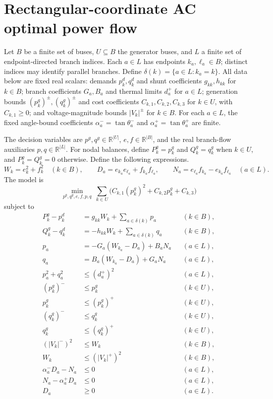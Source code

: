\documentclass{article}
\begin{document}
\section*{Rectangular-coordinate AC optimal power flow}

Let $B$ be a finite set of buses, $U\subseteq B$ the generator buses, and $L$ a finite set of endpoint-directed branch indices. Each $a\in L$ has endpoints $k_a,\ell_a\in B$; distinct indices may identify parallel branches. Define $\delta(k)=\{a\in L:k_a=k\}$. All data below are fixed real scalars: demands $p_k^d,q_k^d$ and shunt coefficients $g_{kk},h_{kk}$ for $k\in B$; branch coefficients $G_a,B_a$ and thermal limits $d_a^+$ for $a\in L$; generation bounds $(p_k^g)^\pm,(q_k^g)^\pm$ and cost coefficients $C_{k,1},C_{k,2},C_{k,3}$ for $k\in U$, with $C_{k,1}\geq0$; and voltage-magnitude bounds $|V_k|^\pm$ for $k\in B$. For each $a\in L$, the fixed angle-bound coefficients $\alpha_a^-=\tan\theta_a^-$ and $\alpha_a^+=\tan\theta_a^+$ are finite.

The decision variables are $p^g,q^g\in\mathbb R^{|U|}$, $e,f\in\mathbb R^{|B|}$, and the real branch-flow auxiliaries $p,q\in\mathbb R^{|L|}$. For nodal balances, define $P_k^g=p_k^g$ and $Q_k^g=q_k^g$ when $k\in U$, and $P_k^g=Q_k^g=0$ otherwise. Define the following expressions.
\[
W_k=e_k^2+f_k^2\quad(k\in B),\qquad
D_a=e_{k_a}e_{\ell_a}+f_{k_a}f_{\ell_a},\qquad
N_a=e_{\ell_a}f_{k_a}-e_{k_a}f_{\ell_a}\quad(a\in L).
\]
The model is
\[
\min_{p^g,q^g,e,f,p,q}\ \sum_{k\in U}\bigl(C_{k,1}(p_k^g)^2+C_{k,2}p_k^g+C_{k,3}\bigr)
\]
subject to
\begin{align*}
P_k^g-p_k^d &= g_{kk}W_k+\sum_{a\in\delta(k)}p_a &&(k\in B),\\
Q_k^g-q_k^d &= -h_{kk}W_k+\sum_{a\in\delta(k)}q_a &&(k\in B),\\
p_a &= -G_a(W_{k_a}-D_a)+B_aN_a &&(a\in L),\\
q_a &= B_a(W_{k_a}-D_a)+G_aN_a &&(a\in L),\\
p_a^2+q_a^2 &\leq (d_a^+)^2 &&(a\in L),\\
(p_k^g)^- &\leq p_k^g &&(k\in U),\\
p_k^g &\leq (p_k^g)^+ &&(k\in U),\\
(q_k^g)^- &\leq q_k^g &&(k\in U),\\
q_k^g &\leq (q_k^g)^+ &&(k\in U),\\
(|V_k|^-)^2 &\leq W_k &&(k\in B),\\
W_k &\leq (|V_k|^+)^2 &&(k\in B),\\
\alpha_a^-D_a-N_a &\leq 0 &&(a\in L),\\
N_a-\alpha_a^+D_a &\leq 0 &&(a\in L),\\
D_a &\geq 0 &&(a\in L).
\end{align*}
\end{document}
